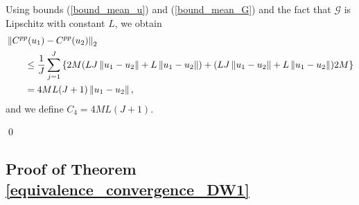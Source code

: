 Using bounds (\ref{bound_mean_u}) and (\ref{bound_mean_G}) and the fact that $\mathcal{G}$ is Lipschitz with constant $L$, we obtain
\begin{align*}
& \left\|C^{pp}(u_1) - C^{pp}(u_2)\right\|_2 \\
& \qquad \le \frac{1}{J} \sum_{j=1}^J \left \{ 2M ( LJ \left\|u_1 - u_2\right\| + L \left\|u_1 - u_2\right\| ) + ( LJ \left\|u_1 - u_2\right\| + L \left\|u_1 - u_2\right\| ) 2M \right \} \\
& \qquad = 4 M L (J+1) \left\|u_1 - u_2\right\|,
\end{align*}
and we define $C_4 = 4 M L (J+1)$.

\qed

\subsection*{Proof of Theorem \ref{equivalence_convergence_DW1}}

